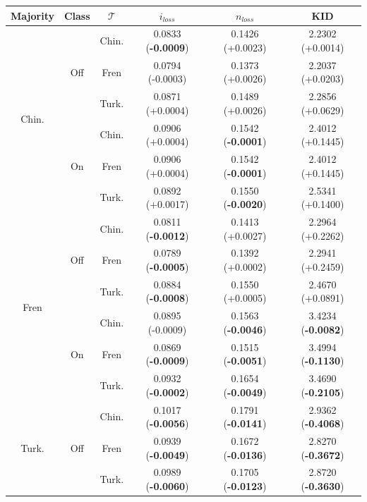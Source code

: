 %
%
\begin{table}[]
\centering
\begin{tabular}{c|c|c|c|c|c}
    \textbf{Majority} & \textbf{Class} & \textbf{$\mathcal{T}$} & \textbf{$i_{loss}$} & \textbf{$n_{loss}$} & \textbf{KID} \\
    \toprule
\multirow{6}{*}{Chin.} & \multirow{3}{*}{Off} & Chin. & 0.0833 (\textbf{-0.0009})       & 0.1426 (+0.0023)       & 2.2302 (+0.0014)   \\
 &  & Fren & 0.0794 (-0.0003)       & 0.1373 (+0.0026)       & 2.2037 (+0.0203)   \\
 &  & Turk. & 0.0871 (+0.0004)       & 0.1489 (+0.0026)       & 2.2856 (+0.0629)  \\
\hhline{~-----}
 & \multirow{3}{*}{On} & Chin. & 0.0906 (+0.0004)       & 0.1542 (\textbf{-0.0001})       & 2.4012 (+0.1445) \\
 &  & Fren & 0.0906 (+0.0004)       & 0.1542 (\textbf{-0.0001})       & 2.4012 (+0.1445) \\
 &  & Turk. & 0.0892 (+0.0017)       & 0.1550 (\textbf{-0.0020})       & 2.5341 (+0.1400)   \\
\midrule
\multirow{6}{*}{Fren} & \multirow{3}{*}{Off} & Chin. & 0.0811 (\textbf{-0.0012})       & 0.1413 (+0.0027)       & 2.2964 (+0.2262) \\
 &  & Fren &0.0789 (\textbf{-0.0005})       & 0.1392 (+0.0002)       & 2.2941 (+0.2459)  \\
 &  & Turk. & 0.0884 (\textbf{-0.0008})       & 0.1550 (+0.0005)       & 2.4670 (+0.0891) \\
\hhline{~-----}
 & \multirow{3}{*}{On} & Chin. & 0.0895 (-0.0009)       & 0.1563 (\textbf{-0.0046})       & 3.4234 (\textbf{-0.0082})\\
 &  & Fren & 0.0869 (\textbf{-0.0009})       & 0.1515 (\textbf{-0.0051})       & 3.4994 (\textbf{-0.1130}) \\
 &  & Turk. & 0.0932 (\textbf{-0.0002})       & 0.1654 (\textbf{-0.0049})       & 3.4690 (\textbf{-0.2105})  \\
\midrule
\multirow{6}{*}{Turk.} & \multirow{3}{*}{Off} & Chin. & 0.1017 (\textbf{-0.0056})       & 0.1791 (\textbf{-0.0141})       & 2.9362 (\textbf{-0.4068}) \\
 &  & Fren & 0.0939 (\textbf{-0.0049})       & 0.1672 (\textbf{-0.0136})       & 2.8270 (\textbf{-0.3672}) \\
 &  & Turk. &  0.0989 (\textbf{-0.0060})       & 0.1705 (\textbf{-0.0123})       & 2.8720 (\textbf{-0.3630}) \\

\end{tabular}
\end{table}
